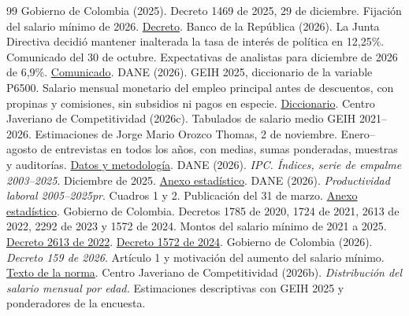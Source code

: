 \begin{thebibliography}{99}
\small
\setlength{\itemsep}{1pt}
\setlength{\parskip}{0pt}
 Gobierno de Colombia (2025). Decreto 1469 de 2025, 29 de diciembre. Fijación del salario mínimo de 2026. \href{https://cancilleria.gov.co/normograma/compilacion/docs/decreto_1469_2025.htm}{Decreto}.
 Banco de la República (2026). La Junta Directiva decidió mantener inalterada la tasa de interés de política en 12,25\%. Comunicado del 30 de octubre. Expectativas de analistas para diciembre de 2026 de 6,9\%. \href{https://www.banrep.gov.co/es/noticias/junta-directiva/junta-directiva-octubre-2026}{Comunicado}.
 DANE (2026). GEIH 2025, diccionario de la variable P6500. Salario mensual monetario del empleo principal antes de descuentos, con propinas y comisiones, sin subsidios ni pagos en especie. \href{https://microdatos.dane.gov.co/index.php/catalog/853/variable/F2/V122?name=P6500}{Diccionario}.
 Centro Javeriano de Competitividad (2026c). Tabulados de salario medio GEIH 2021--2026. Estimaciones de Jorge Mario Orozco Thomas, 2 de noviembre. Enero--agosto de entrevistas en todos los años, con medias, sumas ponderadas, muestras y auditorías. \href{https://github.com/oliverpardo1979/Informe-CJC-SM/tree/main/data/salario_medio_geih}{Datos y metodología}.
 DANE (2026). \textit{IPC. Índices, serie de empalme 2003--2025}. Diciembre de 2025. \href{https://www.dane.gov.co/files/operaciones/IPC/dic2025/anex-IPC-Indices-dic2025.xlsx}{Anexo estadístico}.
 DANE (2026). \textit{Productividad laboral 2005--2025pr}. Cuadros 1 y 2. Publicación del 31 de marzo. \href{https://www.dane.gov.co/files/operaciones/PTF/anex-PTF-ProductividadLaboral-2025.xlsx}{Anexo estadístico}.
 Gobierno de Colombia. Decretos 1785 de 2020, 1724 de 2021, 2613 de 2022, 2292 de 2023 y 1572 de 2024. Montos del salario mínimo de 2021 a 2025. \href{https://cancilleria.gov.co/normograma/compilacion/docs/decreto_2613_2022.htm}{Decreto 2613 de 2022}. \href{https://www.funcionpublica.gov.co/eva/gestornormativo/norma.php?i=257156}{Decreto 1572 de 2024}.
 Gobierno de Colombia (2026). \textit{Decreto 159 de 2026}. Artículo 1 y motivación del aumento del salario mínimo. \href{https://cancilleria.gov.co/normograma/compilacion/docs/decreto_0159_2026.htm}{Texto de la norma}.
 Centro Javeriano de Competitividad (2026b). \textit{Distribución del salario mensual por edad.} Estimaciones descriptivas con GEIH 2025 y ponderadores de la encuesta.

\end{thebibliography}
